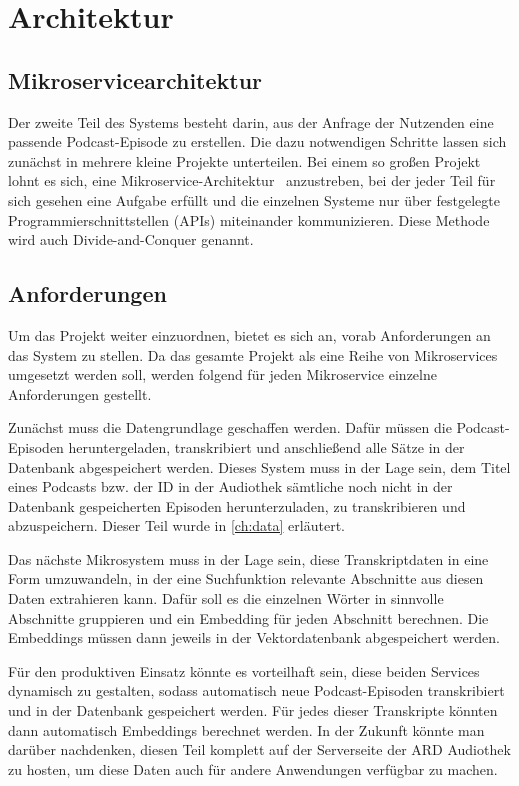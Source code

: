\chapter{Architektur}\label{ch:method}

\section{Mikroservicearchitektur}

Der zweite Teil des Systems besteht darin, aus der Anfrage der Nutzenden eine passende Podcast-Episode zu erstellen.
Die dazu notwendigen Schritte lassen sich zunächst in mehrere kleine Projekte unterteilen.
Bei einem so großen Projekt lohnt es sich, eine Mikroservice-Architektur~\cite{fowler} anzustreben, bei der jeder Teil für sich gesehen eine Aufgabe erfüllt und die einzelnen Systeme nur über festgelegte Programmierschnittstellen (APIs) miteinander kommunizieren.
Diese Methode wird auch Divide-and-Conquer genannt.

\section{Anforderungen}

Um das Projekt weiter einzuordnen, bietet es sich an, vorab Anforderungen an das System zu stellen.
Da das gesamte Projekt als eine Reihe von Mikroservices umgesetzt werden soll, werden folgend für jeden Mikroservice einzelne Anforderungen gestellt.

Zunächst muss die Datengrundlage geschaffen werden.
Dafür müssen die Podcast-Episoden heruntergeladen, transkribiert und anschließend alle Sätze in der Datenbank abgespeichert werden.
Dieses System muss in der Lage sein, dem Titel eines Podcasts bzw. der ID in der Audiothek sämtliche noch nicht in der Datenbank gespeicherten Episoden herunterzuladen, zu transkribieren und abzuspeichern.
Dieser Teil wurde in \autoref{ch:data} erläutert.

Das nächste Mikrosystem muss in der Lage sein, diese Transkriptdaten in eine Form umzuwandeln, in der eine Suchfunktion relevante Abschnitte aus diesen Daten extrahieren kann.
Dafür soll es die einzelnen Wörter in sinnvolle Abschnitte gruppieren und ein Embedding für jeden Abschnitt berechnen.
Die Embeddings müssen dann jeweils in der Vektordatenbank abgespeichert werden.

Für den produktiven Einsatz könnte es vorteilhaft sein, diese beiden Services dynamisch zu gestalten, sodass automatisch neue Podcast-Episoden transkribiert und in der Datenbank gespeichert werden.
Für jedes dieser Transkripte könnten dann automatisch Embeddings berechnet werden.
In der Zukunft könnte man darüber nachdenken, diesen Teil komplett auf der Serverseite der ARD Audiothek zu hosten, um diese Daten auch für andere Anwendungen verfügbar zu machen.

